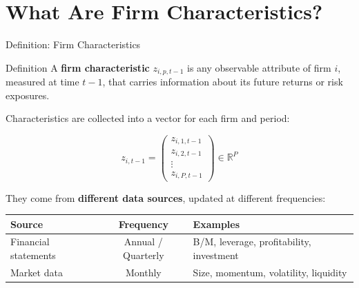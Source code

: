 \documentclass[aspectratio=169, 10pt]{beamer}
\begin{document}
\section{What Are Firm Characteristics?}
%
%
\begin{frame}{Definition: Firm Characteristics}

\begin{block}{Definition}
A \textbf{firm characteristic} $z_{i,p,t-1}$ is any observable attribute of firm $i$,
measured at time $t-1$, that carries information about its future returns or risk
exposures.
\end{block}

\bigskip
Characteristics are collected into a vector for each firm and period:

$$z_{i,t-1} = \begin{pmatrix} z_{i,1,t-1} \\ z_{i,2,t-1} \\ \vdots \\ z_{i,P,t-1} \end{pmatrix} \in \mathbb{R}^P$$

\medskip
They come from \textbf{different data sources}, updated at different frequencies:

\begin{center}
\begin{tabular}{lcl}
\toprule
\textbf{Source} & \textbf{Frequency} & \textbf{Examples} \\
\midrule
Financial statements & Annual / Quarterly & B/M, leverage, profitability, investment \\
Market data         & Monthly            & Size, momentum, volatility, liquidity \\
\bottomrule
\end{tabular}
\end{center}


\end{frame}
%
%
\end{document}
